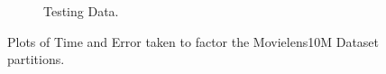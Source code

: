 \begin{figure}
\begin{subfigure}[b]{.45\textwidth}
\begin{center}
		\caption{Testing Data. }
\end{center}
	\end{subfigure}
\hfill
	\caption{Plots of Time and Error taken to factor the Movielens10M Dataset partitions.}	
\end{figure}